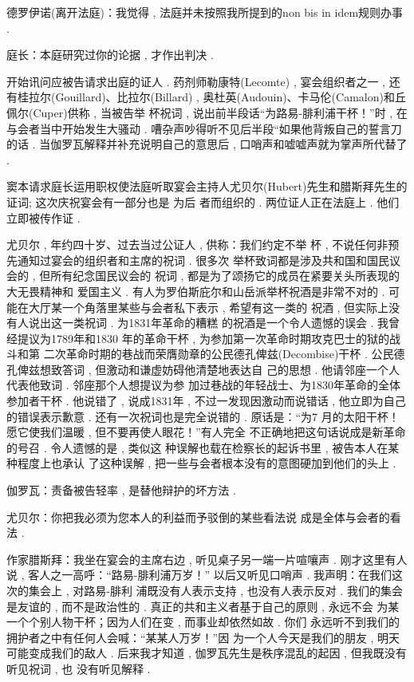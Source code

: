德罗伊诺(离开法庭)：我觉得 , 法庭并未按照我所提到的non bis in idem规则办事 . 

庭长：本庭研究过你的论据 , 才作出判决 . 

开始讯问应被告请求出庭的证人 . 药剂师勒康特(Lecomte) ,  宴会组织者之一 , 还有桂拉尔(Gouillard)、比拉尔(Billard) , 奥杜英(Audouin)、卡马伦(Camalon)和丘佩尔(Cuper)供称 , 当被告举 杯祝词 , 说出前半段话“为路易-腓利浦干杯！”时 , 在与会者当中开始发生大骚动 . 嘈杂声吵得听不见后半段“如果他背叛自己的誓言刀的话 . 当伽罗瓦解释并补充说明自己的意思后 , 口哨声和嘘嘘声就为掌声所代替了 . 

窦本请求庭长运用职权使法庭听取宴会主持人尤贝尔(Hubert)先生和腊斯拜先生的证词; 这次庆祝宴会有一部分也是 为后 者而组织的 . 两位证人正在法庭上 . 他们立即被传作证 . 

尤贝尔 , 年约四十岁、过去当过公证人 , 供称：我们约定不举 杯 , 不说任何非预先通知过宴会的组织者和主席的祝词 . 很多次 举杯致词都是涉及共和国和国民议会的 , 但所有纪念国民议会的 祝词 , 都是为了颂扬它的成员在紧要关头所表现的大无畏精神和 爱国主义 . 有人为罗伯斯庇尔和山岳派举杯祝酒是非常不对的 .  可能在大厅某一个角落里某些与会者私下表示 , 希望有这一类的 祝酒 , 但实际上没有人说出这一类祝词 . 为1831年革命的糟糕 的祝酒是一个令人遗憾的误会 . 我曾经提议为1789年和1830 年的革命干杯 , 为参加第一次革命时期攻克巴士的狱的战斗和第 二次革命时期的巷战而荣膺勋章的公民德孔俾兹(Decombise)干杯 . 公民德孔俾兹想致答词 , 但激动和谦虚妨碍他清楚地表达自 己的思想 . 他请邻座一个人代表他致词 . 邻座那个人想提议为参 加过巷战的年轻战士、为1830年革命的全体参加者干杯 . 他说错了 , 说成1831年 , 不过一发现因激动而说错话 , 他立即为自己 的错误表示歉意 . 还有一次祝词也是完全说错的 . 原话是：“为7 月的太阳干杯！愿它使我们温暖 , 但不要再使人眼花！”有人完全 不正确地把这句话说成是新革命的号召 . 令人遗憾的是 , 类似这 种误解也载在检察长的起诉书里 , 被告本人在某种程度上也承认 了这种误解 , 把一些与会者根本没有的意图硬加到他们的头上 . 

伽罗瓦：责备被告轻率 , 是替他辩护的坏方法 . 

尤贝尔：你把我必须为您本人的利益而予驳倒的某些看法说 成是全体与会者的看法 . 

作家腊斯拜：我坐在宴会的主席右边 , 听见桌子另一端一片喧嚷声 . 刚才这里有人说 , 客人之一高呼：“路易-腓利浦万岁！” 以后又听见口哨声 . 我声明：在我们这次的集会上 , 对路易-腓利 浦既没有人表示支持 , 也没有人表示反对 . 我们的集会是友谊的 ,  而不是政治性的 . 真正的共和主义者基于自己的原则 , 永远不会 为某一个个别人物干杯；因为人们在变 , 而事业却依然如故 . 你们 永远听不到我们的拥护者之中有任何人会喊：“某某人万岁！”因 为一个人今天是我们的朋友 , 明天可能变成我们的敌人 . 后来我才知道 , 伽罗瓦先生是秩序混乱的起因 , 但我既没有听见祝词 , 也 没有听见解释 . 

